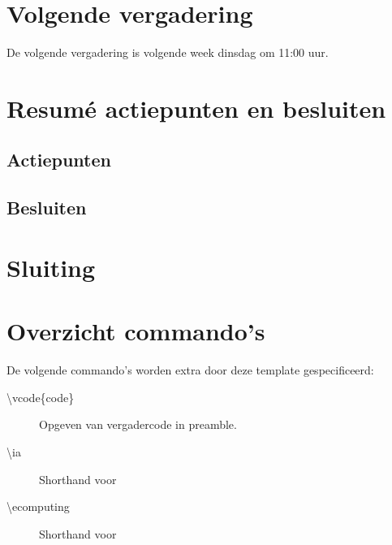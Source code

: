 \documentclass[a4paper]{notulen}
\begin{document}
	\section{Volgende vergadering}
		De volgende vergadering is volgende week dinsdag om 11:00 uur.
	
	\section{Resum\'e actiepunten en besluiten}
		\subsection*{Actiepunten}
			\actiepunten
		\subsection*{Besluiten}
			\besluiten
	
	\section{Sluiting}
		\sluiting

	\appendix 
	\newpage
	\section{Overzicht commando's}
		De volgende commando's worden extra door deze template gespecificeerd:
		\begin{description}
			\item[\textbackslash vcode\{code\}] Opgeven van vergadercode in preamble.
			\item[\textbackslash ia] Shorthand voor \ia
			\item[\textbackslash ecomputing] Shorthand voor \ecomputing
		\end{description}
\end{document}
